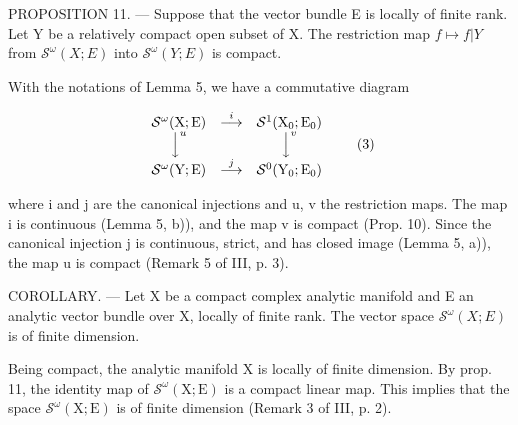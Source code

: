 PROPOSITION 11. --- Suppose that the vector bundle E is locally of finite rank. Let Y be a relatively compact open subset of X. The restriction map \(f \mapsto f|Y\) from \(\mathcal{S}^{\omega}(X;E)\) into \(\mathcal{S}^{\omega}(Y;E)\) is compact.

With the notations of Lemma 5, we have a commutative diagram

\[
\begin{array}{c c c} \mathcal {S} ^ {\omega} (\mathrm{X}; \mathrm{E}) & \stackrel {{i}} {{\longrightarrow}} & \mathcal {S} ^ {1} (\mathrm{X} _ {0}; \mathrm{E} _ {0}) \\ \Big \downarrow^ {u} & & \Big \downarrow^ {v} \\ \mathcal {S} ^ {\omega} (\mathrm{Y}; \mathrm{E}) & \stackrel {{j}} {{\longrightarrow}} & \mathcal {S} ^ {0} (\mathrm{Y} _ {0}; \mathrm{E} _ {0}) \end{array}\tag{3}
\]

where i and j are the canonical injections and u, v the restriction maps. The map i is continuous (Lemma 5, b)), and the map v is compact (Prop. 10). Since the canonical injection j is continuous, strict, and has closed image (Lemma 5, a)), the map u is compact (Remark 5 of III, p. 3).

COROLLARY. --- Let X be a compact complex analytic manifold and E an analytic vector bundle over X, locally of finite rank. The vector space \(\mathcal{S}^{\omega}(X;E)\) is of finite dimension.

Being compact, the analytic manifold X is locally of finite dimension. By prop. 11, the identity map of \(\mathcal{S}^{\omega}(\mathrm{X};\mathrm{E})\) is a compact linear map. This implies that the space \(\mathcal{S}^{\omega}(\mathrm{X};\mathrm{E})\) is of finite dimension (Remark 3 of III, p. 2).

